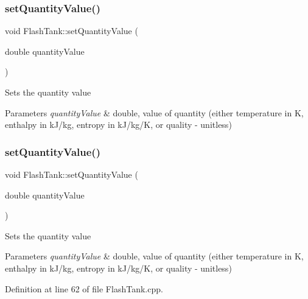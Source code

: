\subsubsection{\texorpdfstring{set\+Quantity\+Value()}{setQuantityValue()}\hspace{0.1cm}{\footnotesize\ttfamily [2/3]}}
{\footnotesize\ttfamily void Flash\+Tank\+::set\+Quantity\+Value (\begin{DoxyParamCaption}\item[{double}]{quantity\+Value }\end{DoxyParamCaption})}

Sets the quantity value 
\begin{DoxyParams}{Parameters}
{\em quantity\+Value} & double, value of quantity (either temperature in K, enthalpy in k\+J/kg, entropy in k\+J/kg/K, or quality -\/ unitless) \\
\hline
\end{DoxyParams}
\mbox{\label{class_flash_tank_ac7392743aeaf8de6ce368814ea42e236}} 
\subsubsection{\texorpdfstring{set\+Quantity\+Value()}{setQuantityValue()}\hspace{0.1cm}{\footnotesize\ttfamily [3/3]}}
{\footnotesize\ttfamily void Flash\+Tank\+::set\+Quantity\+Value (\begin{DoxyParamCaption}\item[{double}]{quantity\+Value }\end{DoxyParamCaption})}

Sets the quantity value 
\begin{DoxyParams}{Parameters}
{\em quantity\+Value} & double, value of quantity (either temperature in K, enthalpy in k\+J/kg, entropy in k\+J/kg/K, or quality -\/ unitless) \\
\hline
\end{DoxyParams}


Definition at line 62 of file Flash\+Tank.\+cpp.

\mbox{\label{class_flash_tank_a8b3bb51a62dac4f76284dfdc114d83fe}} 
